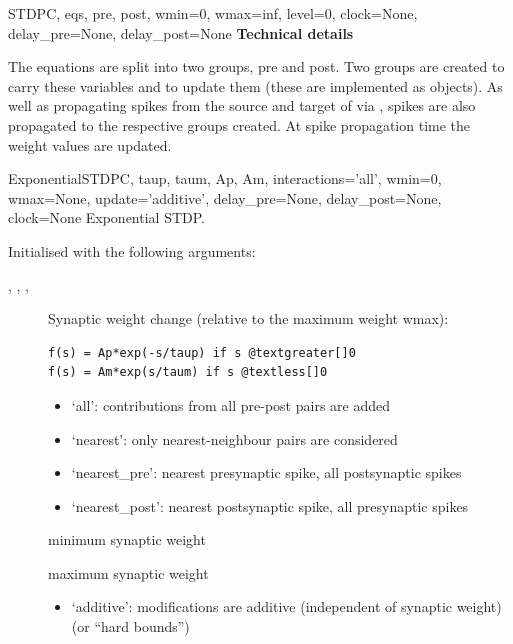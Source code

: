 \documentclass[letterpaper,10pt,english]{manual}
\begin{document}
\begin{classdesc}{STDP}{C, eqs, pre, post, wmin=0, wmax=inf, level=0, clock=None, delay\_pre=None, delay\_post=None}
\textbf{Technical details}

The equations are split into two groups, pre and post. Two groups are created
to carry these variables and to update them (these are implemented as
\hyperlink{brian.NeuronGroup}{} objects). As well as propagating spikes from the source
and target of  via , spikes are also propagated to the respective
groups created. At spike propagation time the weight values are updated.
\end{classdesc}

\hypertarget{brian.ExponentialSTDP}{}\begin{classdesc}{ExponentialSTDP}{C, taup, taum, Ap, Am, interactions='all', wmin=0, wmax=None, update='additive', delay\_pre=None, delay\_post=None, clock=None}
Exponential STDP.

Initialised with the following arguments:
\begin{description}
\item[, , , ] \leavevmode
Synaptic weight change (relative to the maximum weight wmax):

\begin{Verbatim}[commandchars=@\[\]]
f(s) = Ap*exp(-s/taup) if s @textgreater[]0
f(s) = Am*exp(s/taum) if s @textless[]0
\end{Verbatim}

\item[] \leavevmode\begin{itemize}
\item {} 
`all': contributions from all pre-post pairs are added

\item {} 
`nearest': only nearest-neighbour pairs are considered

\item {} 
`nearest\_pre': nearest presynaptic spike, all postsynaptic spikes

\item {} 
`nearest\_post': nearest postsynaptic spike, all presynaptic spikes

\end{itemize}

\item[] \leavevmode
minimum synaptic weight

\item[] \leavevmode
maximum synaptic weight

\item[] \leavevmode\begin{itemize}
\item {} 
`additive': modifications are additive (independent of synaptic weight)
(or ``hard bounds'')


\end{itemize}
\end{description}
\end{classdesc}
\end{document}
